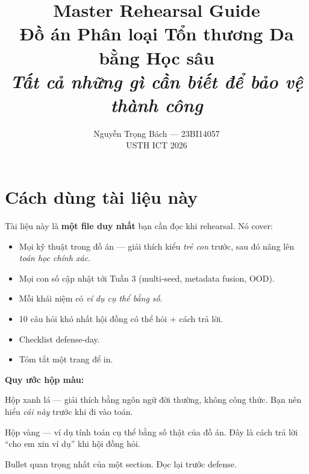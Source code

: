 \documentclass[11pt,a4paper]{article}
\title{
  \vspace{-1.5cm}
  \color{usthblue}\Huge\textbf{Master Rehearsal Guide}\\[6pt]
  \color{black!75}\large Đồ án Phân loại Tổn thương Da bằng Học sâu\\[2pt]
  \normalsize\textit{Tất cả những gì cần biết để bảo vệ thành công}
}
\author{Nguyễn Trọng Bách --- 23BI14057 \\[2pt]\small USTH ICT 2026}
\date{}
\begin{document}
\maketitle
\vspace{-1cm}

{\hypersetup{linkcolor=black}\tableofcontents}

\newpage

\section{Cách dùng tài liệu này}

\begin{idea}
Tài liệu này là \textbf{một file duy nhất} bạn cần đọc khi rehearsal. Nó cover:
\begin{itemize}[leftmargin=*]
  \item Mọi kỹ thuật trong đồ án --- giải thích kiểu \textit{trẻ con} trước, sau đó nâng lên \textit{toán học chính xác}.
  \item Mọi con số cập nhật tới Tuần 3 (multi-seed, metadata fusion, OOD).
  \item Mỗi khái niệm có \textit{ví dụ cụ thể bằng số}.
  \item 10 câu hỏi khó nhất hội đồng có thể hỏi $+$ cách trả lời.
  \item Checklist defense-day.
  \item Tóm tắt một trang để in.
\end{itemize}
\end{idea}

\textbf{Quy ước hộp màu:}

\begin{simple}
Hộp xanh lá --- giải thích bằng ngôn ngữ đời thường, không công thức. Bạn nên hiểu \textit{cái này} trước khi đi vào toán.
\end{simple}

\begin{example}
Hộp vàng --- ví dụ tính toán cụ thể bằng số thật của đồ án. Đây là cách trả lời ``cho em xin ví dụ'' khi hội đồng hỏi.
\end{example}

\begin{idea}
Bullet quan trọng nhất của một section. Đọc lại trước defense.
\end{idea}
\end{document}
